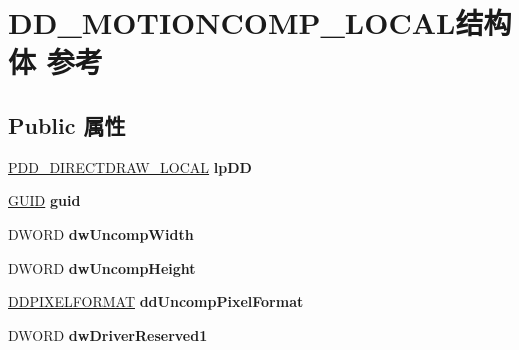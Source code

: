\hypertarget{struct_d_d___m_o_t_i_o_n_c_o_m_p___l_o_c_a_l}{}\section{D\+D\+\_\+\+M\+O\+T\+I\+O\+N\+C\+O\+M\+P\+\_\+\+L\+O\+C\+A\+L结构体 参考}
\label{struct_d_d___m_o_t_i_o_n_c_o_m_p___l_o_c_a_l}
\subsection*{Public 属性}
\begin{DoxyCompactItemize}
\item 
\mbox{\label{struct_d_d___m_o_t_i_o_n_c_o_m_p___l_o_c_a_l_a9234e21fcbf3cfcd83e96b701f724912}} 
\hyperlink{struct___d_d___d_i_r_e_c_t_d_r_a_w___l_o_c_a_l}{P\+D\+D\+\_\+\+D\+I\+R\+E\+C\+T\+D\+R\+A\+W\+\_\+\+L\+O\+C\+AL} {\bfseries lp\+DD}
\item 
\mbox{\label{struct_d_d___m_o_t_i_o_n_c_o_m_p___l_o_c_a_l_ab619ee0932a2f9bae1f00e3a11470ba0}} 
\hyperlink{interface_g_u_i_d}{G\+U\+ID} {\bfseries guid}
\item 
\mbox{\label{struct_d_d___m_o_t_i_o_n_c_o_m_p___l_o_c_a_l_a5d14aaf229b66d172df445724b75ec11}} 
D\+W\+O\+RD {\bfseries dw\+Uncomp\+Width}
\item 
\mbox{\label{struct_d_d___m_o_t_i_o_n_c_o_m_p___l_o_c_a_l_a0a42adba543601543384b07d372f7a16}} 
D\+W\+O\+RD {\bfseries dw\+Uncomp\+Height}
\item 
\mbox{\label{struct_d_d___m_o_t_i_o_n_c_o_m_p___l_o_c_a_l_a8f3d37438b4e5188f9d1e84d57cdc1e9}} 
\hyperlink{struct___d_d_p_i_x_e_l_f_o_r_m_a_t}{D\+D\+P\+I\+X\+E\+L\+F\+O\+R\+M\+AT} {\bfseries dd\+Uncomp\+Pixel\+Format}
\item 
\mbox{\label{struct_d_d___m_o_t_i_o_n_c_o_m_p___l_o_c_a_l_a9a07830863788dc6ccf2e7ecc7cfc2df}} 
D\+W\+O\+RD {\bfseries dw\+Driver\+Reserved1}
\item 

\end{DoxyCompactItemize}

